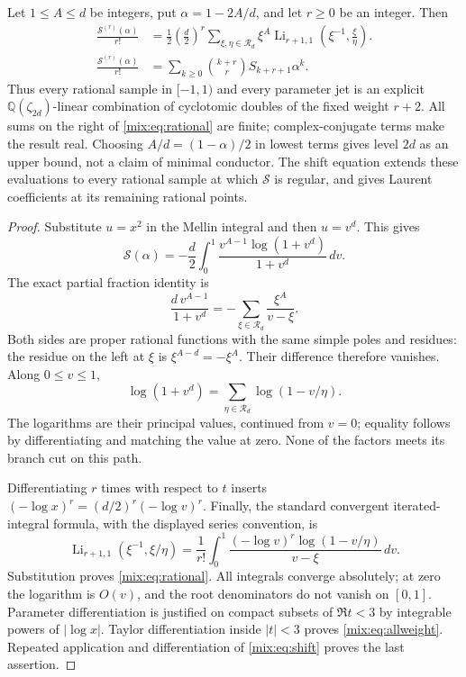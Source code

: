 \begin{theorem}
\label{mix:thm:rational}
Let $1\le A\le d$ be integers, put $\alpha=1-2A/d$, and let $r\ge0$
be an integer. Then
\begin{align}
 \frac{\mathcal S^{(r)}(\alpha)}{r!}
 &=\frac12\left(\frac d2\right)^r
   \sum_{\xi,\eta\in\mathcal R_d}
      \xi^A\operatorname{Li}_{r+1,1}
                    \left(\xi^{-1},\frac\xi\eta\right).
 \label{mix:eq:rational}\\[-1mm]
 \frac{\mathcal S^{(r)}(\alpha)}{r!}
 &=\sum_{k\ge0}\binom{k+r}{r}S_{k+r+1}\alpha^k.
 \label{mix:eq:allweight}
\end{align}
Thus every rational sample in $[-1,1)$ and every parameter jet is an
explicit $\mathbb Q(\zeta_{2d})$-linear combination of cyclotomic doubles
of the fixed weight $r+2$.  All sums on the right of
\eqref{mix:eq:rational} are finite; complex-conjugate terms make the
result real. Choosing $A/d=(1-\alpha)/2$ in lowest terms gives level $2d$
as an upper bound, not a claim of minimal conductor.
The shift equation extends these evaluations to every rational sample
at which $\mathcal S$ is regular, and gives Laurent coefficients at its
remaining rational points.
\end{theorem}
\begin{proof}
Substitute $u=x^2$ in the Mellin integral and then $u=v^d$. This gives
\[
 \mathcal S(\alpha)
 =-\frac d2\int_0^1
       \frac{v^{A-1}\log(1+v^d)}{1+v^d}\,dv.
\]
The exact partial fraction identity is
\begin{equation}\label{mix:eq:partial}
 \frac{d\,v^{A-1}}{1+v^d}
       =-\sum_{\xi\in\mathcal R_d}\frac{\xi^A}{v-\xi}.
\end{equation}
Both sides are proper rational functions with the same simple poles and
residues: the residue on the left at $\xi$ is
$\xi^{A-d}=-\xi^A$. Their difference therefore vanishes.
Along $0\le v\le1$,
\[
 \log(1+v^d)=\sum_{\eta\in\mathcal R_d}\log(1-v/\eta).
\]
The logarithms are their principal values, continued from $v=0$; equality
follows by differentiating and matching the value at zero. None of the
factors meets its branch cut on this path.

Differentiating $r$ times with respect to $t$ inserts
$(-\log x)^r=(d/2)^r(-\log v)^r$. Finally, the standard convergent
iterated-integral formula, with the displayed series convention, is
\[
 \operatorname{Li}_{r+1,1}(\xi^{-1},\xi/\eta)
 =\frac1{r!}\int_0^1
       \frac{(-\log v)^r\log(1-v/\eta)}{v-\xi}\,dv.
\]
Substitution proves \eqref{mix:eq:rational}. All integrals converge
absolutely; at zero the logarithm is $O(v)$, and the root denominators
do not vanish on $[0,1]$. Parameter differentiation is justified on
compact subsets of $\Re t<3$ by integrable powers of $|\log x|$.
Taylor differentiation inside $|t|<3$ proves
\eqref{mix:eq:allweight}.  Repeated application and differentiation of
\eqref{mix:eq:shift} proves the last assertion.
\end{proof}

